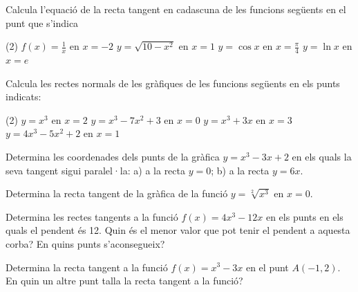 \begin{mylist}
	
\exer	Calcula l'equació de la recta tangent en cadascuna de les funcions següents en el punt que s'indica
	\begin{tasks}(2)
		\task $f(x)=\frac{1}{x}$ en $x=-2$
		\task $y=\sqrt{10-x^2}$ en $x=1$
		\task $y=\cos x$ en $x=\frac{\pi}{4}$
		\task $y=\ln x$ en $x=e$
	\end{tasks}
 
 \answers{[$y=-\frac{x}{4}-1$, $y=-\frac{x}{3}-\frac{10}{3}$, $y=-\frac{\sqrt{2}}{2}x+\frac{\sqrt{2}}{8}(\pi+4)$, $y=\frac{x}{e}$]}
 
	\exer Calcula les rectes normals de les gràfiques de les funcions següents en els punts indicats:
	
	\begin{tasks}(2) 
		\task$y= x^3$  en $x = 2$   
		\task $y = x^3 - 7x^{2} + 3$ en $x = 0$
		\task $y= x^3  + 3x$  en $x = 3$   
		\task $y = 4x^3 - 5x^{2} + 2$ en $x = 1$
	\end{tasks}	
	 
	 \answers{[$y=-\frac{x}{12}+\frac{49}{6}$, $y=3$, $y=-\frac{x}{30}+\frac{361}{10}$, 
	 	$y=-\frac{x}{2}+\frac{5}{2}$]}
	 
		\exer Determina les coordenades dels punts de la gràfica $y = x^3 - 3x + 2$ en els quals la seva tangent sigui paralel·la: a) a la recta $y = 0$;   b) a la recta $y= 6x$.
			
		\answers{[Resol $3x^2-3=0$ $\rightarrow$ $x=\pm 1$, Resol $3x^2-3=6$ $\rightarrow$ $x=\pm 3$]}	
			
			\exer Determina la recta tangent de la gràfica de la funció $y=\sqrt[{2}]{x^{3} } $ en $x = 0$.
			
			
			\exer Determina les rectes tangents a la funció $f(x) = 4x^{3} - 12x$ en els punts en els quals el pendent és 12. Quin és el menor valor que pot tenir el pendent a aquesta corba? En quins punts s'aconsegueix?
			
			
			\exer Determina la recta tangent a la funció $f(x) = x^{3} - 3x$ en el punt $A( -1, 2)$. En quin un altre punt talla la recta tangent a la funció?
			

\end{mylist}
